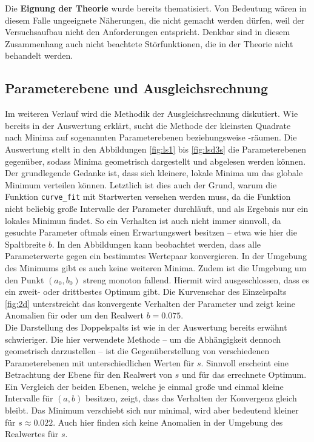 Die \textbf{Eignung der Theorie} wurde bereits thematisiert. Von Bedeutung wären in diesem Falle ungeeignete Näherungen, die nicht gemacht werden dürfen, weil der Versuchsaufbau nicht
den Anforderungen entspricht. Denkbar sind in diesem Zusammenhang auch nicht beachtete Störfunktionen, die in der Theorie nicht behandelt werden.

\subsection{Parameterebene und Ausgleichsrechnung}
Im weiteren Verlauf wird die Methodik der Ausgleichsrechnung diskutiert.
Wie bereits in der Auswertung erklärt, sucht die Methode der kleinsten Quadrate nach Minima auf sogenannten Parameterebenen beziehungsweise -räumen.
Die Auswertung stellt in den Abbildungen \ref{fig:ls1} bis \ref{fig:lsd3s} die Parameterebenen gegenüber, sodass Minima geometrisch dargestellt und abgelesen werden können.
Der grundlegende Gedanke ist, dass sich kleinere, lokale Minima um das globale Minimum verteilen können.
Letztlich ist dies auch der Grund, warum die Funktion \texttt{curve\_fit} mit Startwerten versehen werden muss, da die Funktion nicht beliebig große Intervalle der Parameter durchläuft, und als Ergebnis nur ein lokales Minimun findet.
So ein Verhalten ist auch nicht immer sinnvoll, da gesuchte Parameter oftmals einen Erwartungswert besitzen -- etwa wie hier die Spaltbreite $b$.
In den Abbildungen kann beobachtet werden, dass alle Parameterwerte gegen ein bestimmtes Wertepaar konvergieren. In der Umgebung des Minimums gibt es auch keine weiteren Minima. Zudem ist die Umgebung um den Punkt $(a_0, b_0)$ streng monoton fallend.
Hiermit wird ausgeschlossen, dass es ein zweit- oder drittbestes Optimum gibt.
Die Kurvenschar des Einzelspalts \ref{fig:2d} unterstreicht das konvergente Verhalten der Parameter und zeigt keine Anomalien für oder um den Realwert $b = 0.075$.\\

Die Darstellung des Doppelspalts ist wie in der Auswertung bereits erwähnt schwieriger.
Die hier verwendete Methode -- um die Abhängigkeit dennoch geometrisch darzustellen -- ist die Gegenüberstellung von verschiedenen Parameterebenen mit unterschiedlichen Werten für $s$.
Sinnvoll erscheint eine Betrachtung der Ebene für den Realwert von $s$ und für das errechnete Optimum.
Ein Vergleich der beiden Ebenen, welche je einmal große und einmal kleine Intervalle für $(a, b)$ besitzen, zeigt, dass das Verhalten der Konvergenz gleich bleibt. Das Minimum verschiebt sich nur minimal, wird aber bedeutend kleiner für $s \approx 0.022$. Auch hier finden sich keine Anomalien in der Umgebung des Realwertes für $s$.\\

